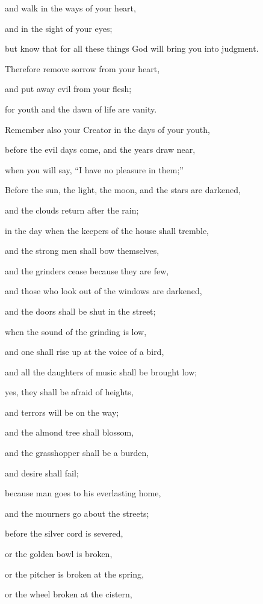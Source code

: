 and walk in the ways of your heart,

and in the sight of your eyes;

but know that for all these things God will bring you into judgment.

\myverse{}Therefore remove sorrow from your heart,

and put away evil from your flesh;

for youth and the dawn of life are vanity.


\mychapter{} \myverse*{}Remember also your Creator in the days of your youth,

\quad\quad before the evil days come, and the years draw near,

when you will say, “I have no pleasure in them;”

\myverse{}Before the sun, the light, the moon, and the stars are darkened,

and the clouds return after the rain;

\myverse{}in the day when the keepers of the house shall tremble,

and the strong men shall bow themselves,

and the grinders cease because they are few,

and those who look out of the windows are darkened,

\myverse{}and the doors shall be shut in the street;

when the sound of the grinding is low,

and one shall rise up at the voice of a bird,

and all the daughters of music shall be brought low;

\myverse{}yes, they shall be afraid of heights,

and terrors will be on the way;

and the almond tree shall blossom,

and the grasshopper shall be a burden,

and desire shall fail;

because man goes to his everlasting home,

and the mourners go about the streets;

\myverse{}before the silver cord is severed,

or the golden bowl is broken,

or the pitcher is broken at the spring,

or the wheel broken at the cistern,

